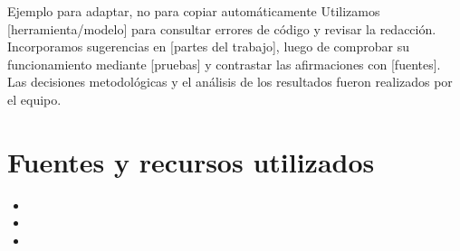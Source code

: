 \documentclass[11pt,a4paper]{article}
\begin{document}
\begin{destacado}{Ejemplo para adaptar, no para copiar automáticamente}
Utilizamos [herramienta/modelo] para consultar errores de código y revisar la redacción. Incorporamos sugerencias en [partes del trabajo], luego de comprobar su funcionamiento mediante [pruebas] y contrastar las afirmaciones con [fuentes]. Las decisiones metodológicas y el análisis de los resultados fueron realizados por el equipo.
\end{destacado}

\section*{Fuentes y recursos utilizados}
\begin{itemize}
\item {}
\item {}
\item {}
\end{itemize}

\end{document}
